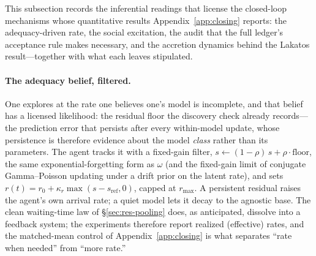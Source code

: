 This subsection records the inferential readings that license the closed-loop mechanisms whose
quantitative results Appendix~\ref{app:closing} reports: the adequacy-driven rate, the social
excitation, the audit that the full ledger's acceptance rule makes necessary, and the accretion
dynamics behind the Lakatos result---together with what each leaves stipulated.

\paragraph{The adequacy belief, filtered.}
One explores at the rate one believes one's model is incomplete, and that belief has a licensed
likelihood: the residual floor the discovery check already records---the prediction error that
persists after every within-model update, whose persistence is therefore evidence about the
model \emph{class} rather than its parameters. The agent tracks it with a fixed-gain filter,
$s \leftarrow (1-\rho)\,s + \rho\cdot\mathrm{floor}$, the same exponential-forgetting form as
$\omega$ (and the fixed-gain limit of conjugate Gamma--Poisson updating under a drift prior on
the latent rate), and sets $r(t) = r_0 + \kappa_r \max(s - s_{\mathrm{ref}}, 0)$, capped at
$r_{\max}$. A persistent residual raises the agent's own arrival rate; a quiet model lets it
decay to the agnostic base. The clean waiting-time law of \S\ref{sec:res-pooling} does, as
anticipated, dissolve into a feedback system; the experiments therefore report realized
(effective) rates, and the matched-mean control of Appendix~\ref{app:closing} is what separates
``rate when needed'' from ``more rate.''


